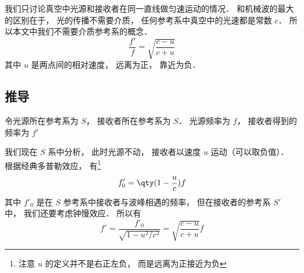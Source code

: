 

我们只讨论真空中光源和接收者在同一直线做匀速运动的情况． 和机械波的最大的区别在于， 光的传播不需要介质， 任何参考系中真空中的光速都是常数 $c$． %
所以本文中我们不需要介质参考系的概念．
\begin{equation}
\frac{f'}{f} = \sqrt{\frac{c - u}{c + u}}
\end{equation}
其中 $u$ 是两点间的相对速度， 远离为正， 靠近为负．

\subsection{推导}
令光源所在参考系为 $S$， 接收者所在参考系为 $S$． 光源频率为 $f$， 接收者得到的频率为 $f'$

我们现在 $S$ 系中分析， 此时光源不动， 接收者以速度 $u$ 运动（可以取负值）． 根据经典多普勒效应， 有\footnote{注意 $u$ 的定义并不是右正左负， 而是远离为正接近为负}
\begin{equation}
f'_0 = \qty(1 - \frac{u}{c})f
\end{equation}
其中 $f'_0$ 是在 $S$ 参考系中接收者与波峰相遇的频率， 但在接收者的参考系 $S'$ 中， 我们还要考虑钟慢效应． 所以有
\begin{equation}
f' = \frac{f'_0}{\sqrt{1 - u^2/c^2}} = \sqrt{\frac{c - u}{c + u}} f
\end{equation}
